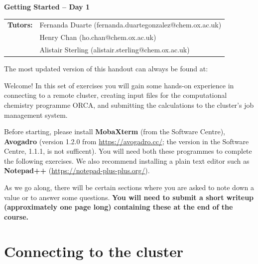 \documentclass[10pt]{article}
\begin{document}
\textbf{\LARGE Getting Started -- Day 1}

\vspace{0.2cm}

\begin{tabular}{ll} %
    \textbf{Tutors:} & Fernanda Duarte (fernanda.duartegonzalez@chem.ox.ac.uk) \\
     & Henry Chan (ho.chan@chem.ox.ac.uk) \\
     & Alistair Sterling (alistair.sterling@chem.ox.ac.uk)
\end{tabular}

\vspace{0.2cm}

\begin{tcolorbox}[colframe=Green!70!white, colback=Green!10!white]
    The most updated version of this handout can always be found at:
    \begin{center}
    \end{center}
\end{tcolorbox}

Welcome! In this set of exercises you will gain some hands-on experience in connecting to a remote cluster, creating input files for the computational chemistry programme ORCA, and submitting the calculations to the cluster's job management system. 

Before starting, please install \textbf{MobaXterm} (from the Software Centre), \textbf{Avogadro} (version 1.2.0 from \url{https://avogadro.cc/}; the version in the Software Centre, 1.1.1, is not sufficent). You will need both these programmes to complete the following exercises. We also recommend installing a plain text editor such as \textbf{Notepad++} (\url{https://notepad-plus-plus.org/}).

As we go along, there will be certain sections where you are asked to note down a value or to answer some questions. \textbf{You will need to submit a short writeup (approximately one page long) containing these at the end of the course.}

\section{Connecting to the cluster}
\end{document}
